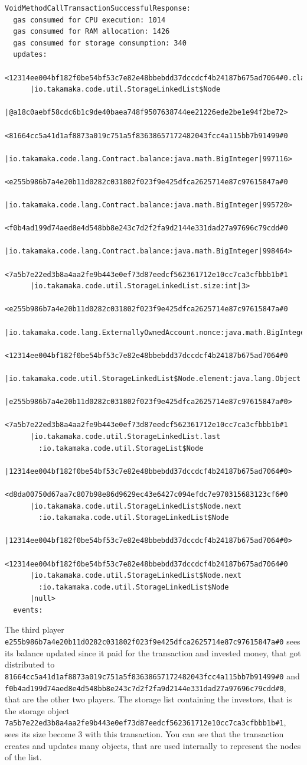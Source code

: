 \documentclass[a4paper,]{book}
\begin{document}
{\begin{myverbatim}
\begin{verbatim}
VoidMethodCallTransactionSuccessfulResponse:
  gas consumed for CPU execution: 1014
  gas consumed for RAM allocation: 1426
  gas consumed for storage consumption: 340
  updates:
    <12314ee004bf182f0be54bf53c7e82e48bbebdd37dccdcf4b24187b675ad7064#0.class
      |io.takamaka.code.util.StorageLinkedList$Node
      |@a18c0aebf58cdc6b1c9de40baea748f9507638744ee21226ede2be1e94f2be72>
    <81664cc5a41d1af8873a019c751a5f83638657172482043fcc4a115bb7b91499#0
      |io.takamaka.code.lang.Contract.balance:java.math.BigInteger|997116>
    <e255b986b7a4e20b11d0282c031802f023f9e425dfca2625714e87c97615847a#0
      |io.takamaka.code.lang.Contract.balance:java.math.BigInteger|995720>
    <f0b4ad199d74aed8e4d548bb8e243c7d2f2fa9d2144e331dad27a97696c79cdd#0
      |io.takamaka.code.lang.Contract.balance:java.math.BigInteger|998464>
    <7a5b7e22ed3b8a4aa2fe9b443e0ef73d87eedcf562361712e10cc7ca3cfbbb1b#1
      |io.takamaka.code.util.StorageLinkedList.size:int|3>
    <e255b986b7a4e20b11d0282c031802f023f9e425dfca2625714e87c97615847a#0
      |io.takamaka.code.lang.ExternallyOwnedAccount.nonce:java.math.BigInteger|1>
    <12314ee004bf182f0be54bf53c7e82e48bbebdd37dccdcf4b24187b675ad7064#0
      |io.takamaka.code.util.StorageLinkedList$Node.element:java.lang.Object
      |e255b986b7a4e20b11d0282c031802f023f9e425dfca2625714e87c97615847a#0>
    <7a5b7e22ed3b8a4aa2fe9b443e0ef73d87eedcf562361712e10cc7ca3cfbbb1b#1
      |io.takamaka.code.util.StorageLinkedList.last
        :io.takamaka.code.util.StorageList$Node
      |12314ee004bf182f0be54bf53c7e82e48bbebdd37dccdcf4b24187b675ad7064#0>
    <d8da00750d67aa7c807b98e86d9629ec43e6427c094efdc7e970315683123cf6#0
      |io.takamaka.code.util.StorageLinkedList$Node.next
        :io.takamaka.code.util.StorageLinkedList$Node
      |12314ee004bf182f0be54bf53c7e82e48bbebdd37dccdcf4b24187b675ad7064#0>
    <12314ee004bf182f0be54bf53c7e82e48bbebdd37dccdcf4b24187b675ad7064#0
      |io.takamaka.code.util.StorageLinkedList$Node.next
        :io.takamaka.code.util.StorageLinkedList$Node
      |null>
  events:
\end{verbatim}
\end{myverbatim}

The third player
\texttt{e255b986b7a4e20b11d0282c031802f023f9e425dfca2625714e87c97615847a\#0}
sees its balance updated since it paid for the transaction and invested
money, that got distributed to
\texttt{81664cc5a41d1af8873a019c751a5f83638657172482043fcc4a115bb7b91499\#0}
and
\texttt{f0b4ad199d74aed8e4d548bb8e243c7d2f2fa9d2144e331dad27a97696c79cdd\#0},
that are the other two players. The storage list containing the
investors, that is the storage object
\texttt{7a5b7e22ed3b8a4aa2fe9b443e0ef73d87eedcf562361712e10cc7ca3cfbbb1b\#1},
sees its size become 3 with this transaction. You can see that the
transaction creates and updates many objects, that are used internally
to represent the nodes of the list.

}
\end{document}
